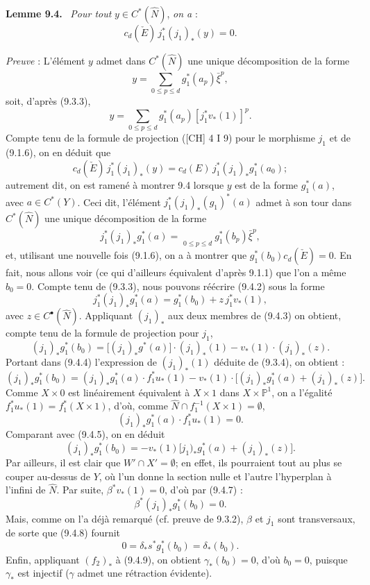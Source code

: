 \documentclass[11pt]{article}
\newenvironment{statement}[1]{\par\medskip\noindent\textbf{#1.}\ }{\par\medskip}
\begin{document}
\begin{statement}{Lemme 9.4}
\emph{Pour tout} $y\in C^*(\widehat N)$, \emph{on a} :
\[
c_d(\check E)\,j_1^*(j_1)_*(y)=0.
\]
\end{statement}

\emph{Preuve} : L'élément $y$ admet dans $C^*(\widehat N)$ une unique décomposition de la forme
\[
y=\sum_{0\le p\le d}g_1^*(a_p)\bar\xi^p,
\]
soit, d'après (9.3.3),
\[
y=\sum_{0\le p\le d}g_1^*(a_p)[j_1^*v_*(1)]^p.
\tag{9.4.1}
\]
Compte tenu de la formule de projection ([CH] 4 I 9) pour le morphisme $j_1$ et de (9.1.6), on en déduit que
\[
c_d(\check E)\,j_1^*(j_1)_*(y)=c_d(E)\,j_1^*(j_1)_*g_1^*(a_0);
\]
autrement dit, on est ramené à montrer 9.4 lorsque $y$ est de la forme $g_1^*(a)$, avec $a\in C^*(Y)$. Ceci dit, l'élément $j_1^*(j_1)_*(g_1)^*(a)$ admet à son tour dans $C^*(\widehat N)$ une unique décomposition de la forme
\[
j_1^*(j_1)_*g_1^*(a)=\mathop{\phantom{\sum}}\limits_{0\le p\le d}g_1^*(b_p)\bar\xi^p,
\tag{9.4.2}
\]
et,
utilisant une nouvelle fois (9.1.6), on a à montrer que $g_1^*(b_0)c_d(\check E)=0$. En fait, nous allons voir (ce qui d'ailleurs équivalent d'après 9.1.1) que l'on a même $b_0=0$. Compte tenu de (9.3.3), nous pouvons réécrire (9.4.2) sous la forme
\[
j_1^*(j_1)_*g_1^*(a)=g_1^*(b_0)+z\,j_1^*v_*(1),
\tag{9.4.3}
\]
avec $z\in C^{\bullet}(\widehat N)$. Appliquant $(j_1)_*$ aux deux membres de (9.4.3) on obtient, compte tenu de la formule de projection pour $j_1$,
\[
(j_1)_*g_1^*(b_0)=\bigl[(j_1)_*g^*(a)\bigr]\cdot(j_1)_*(1)-v_*(1)\cdot(j_1)_*(z).
\tag{9.4.4}
\]
Portant dans (9.4.4) l'expression de $(j_1)_*(1)$ déduite de (9.3.4), on obtient :
\[
(j_1)_*g_1^*(b_0)=
(j_1)_*g_1^*(a)\cdot f_1^*u_*(1)-v_*(1)\cdot\bigl[(j_1)_*g_1^*(a)+(j_1)_*(z)\bigr].
\tag{9.4.5}
\]
Comme $X\times0$ est linéairement équivalent à $X\times1$ dans $X\times\mathbb P^1$, on a l'égalité $f_1^*u_*(1)=f_1^*(X\times1)$, d'où, comme $\widehat N\cap f_1^{-1}(X\times1)=\emptyset$,
\[
(j_1)_*g_1^*(a)\cdot f_1^*u_*(1)=0.
\tag{9.4.6}
\]
Comparant avec (9.4.5), on en déduit
\[
(j_1)_*g_1^*(b_0)=-v_*(1)\bigl[j_1)_*g_1^*(a)+(j_1)_*(z)\bigr].
\tag{9.4.7}
\]
Par ailleurs, il est clair que $W'\cap X'=\emptyset$; en effet, ils pourraient tout au plus se couper au-dessus de $Y$, où l'un donne la section nulle et l'autre l'hyperplan à l'infini de $\widehat N$. Par suite, $\beta^*v_*(1)=0$, d'où par (9.4.7) :
\[
\beta^*(j_1)_*g_1^*(b_0)=0.
\tag{9.4.8}
\]
Mais, comme on l'a déjà remarqué (cf. preuve de 9.3.2), $\beta$ et $j_1$ sont transversaux, de sorte que (9.4.8) fournit
\[
0=\delta_*s^*g_1^*(b_0)=\delta_*(b_0).
\tag{9.4.9}
\]
Enfin,
appliquant $(f_2)_*$ à (9.4.9), on obtient $\gamma_*(b_0)=0$, d'où $b_0=0$, puisque $\gamma_*$ est injectif ($\gamma$ admet une rétraction évidente).
\end{document}
